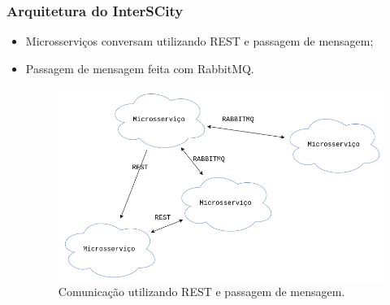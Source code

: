 \begin{frame}
    \frametitle{Arquitetura do InterSCity}
    \begin{itemize}
        \item Microsserviços conversam utilizando REST e passagem de mensagem;
        \item Passagem de mensagem feita com RabbitMQ.
            \begin{figure}
                \includegraphics[scale=0.3]{figures/communication.png}
                \caption{Comunicação utilizando REST e passagem de mensagem.}
            \end{figure}
    \end{itemize}
\end{frame}
